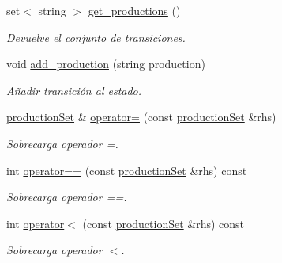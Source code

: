 \begin{DoxyCompactItemize}
\mbox{\label{classproduction_set_aa11c806944c2aedd344f48b99dae3909}} 
set$<$ string $>$ \mbox{\hyperlink{classproduction_set_aa11c806944c2aedd344f48b99dae3909}{get\+\_\+productions}} ()
\begin{DoxyCompactList}\small\item\em Devuelve el conjunto de transiciones. \end{DoxyCompactList}\item 
\mbox{\label{classproduction_set_ac85e72010ffaf536d66c465f51ed82e0}} 
void \mbox{\hyperlink{classproduction_set_ac85e72010ffaf536d66c465f51ed82e0}{add\+\_\+production}} (string production)
\begin{DoxyCompactList}\small\item\em Añadir transición al estado. \end{DoxyCompactList}\item 
\mbox{\label{classproduction_set_a733729272299767dc96b7c1f00a57405}} 
\mbox{\hyperlink{classproduction_set}{production\+Set}} \& \mbox{\hyperlink{classproduction_set_a733729272299767dc96b7c1f00a57405}{operator=}} (const \mbox{\hyperlink{classproduction_set}{production\+Set}} \&rhs)
\begin{DoxyCompactList}\small\item\em Sobrecarga operador =. \end{DoxyCompactList}\item 
\mbox{\label{classproduction_set_a076cffeb6ccd1b32756f6be16bb106f8}} 
int \mbox{\hyperlink{classproduction_set_a076cffeb6ccd1b32756f6be16bb106f8}{operator==}} (const \mbox{\hyperlink{classproduction_set}{production\+Set}} \&rhs) const
\begin{DoxyCompactList}\small\item\em Sobrecarga operador ==. \end{DoxyCompactList}\item 
\mbox{\label{classproduction_set_a114e5b417e44facba2aaab58466dd62d}} 
int \mbox{\hyperlink{classproduction_set_a114e5b417e44facba2aaab58466dd62d}{operator$<$}} (const \mbox{\hyperlink{classproduction_set}{production\+Set}} \&rhs) const
\begin{DoxyCompactList}\small\item\em Sobrecarga operador $<$. \end{DoxyCompactList}\end{DoxyCompactItemize}



